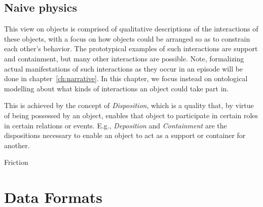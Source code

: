 \subsection{Naive physics}

This view on objects is comprised of qualitative descriptions of the interactions of these objects, with a focus on how objects could be arranged so as to constrain each other's behavior. The prototypical examples of such interactions are support and containment, but many other interactions are possible. Note, formalizing actual manifestations of such interactions as they occur in an episode will be done in chapter~\ref{ch:narrative}. In this chapter, we focus instead on ontological modelling about what kinds of interactions an object could take part in. 

This is achieved by the concept of \emph{Disposition}, which is a quality that, by virtue of being possessed by an object, enables that object to participate in certain roles in certain relations or events. E.g., \emph{Deposition} and \emph{Containment} are the dispositions necessary to enable an object to act as a support or container for another.

\begin{ODP}{Friction}
\end{ODP}



\section{Data Formats}
\label{sec:background:formats}

